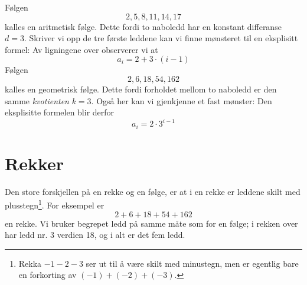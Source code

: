 Følgen 
\[ 2, 5, 8, 11, 14, 17 \]
kalles en aritmetisk følge. Dette fordi to naboledd har en konstant differanse $ {d=3} $. Skriver vi opp de tre første leddene kan vi finne mønsteret til en eksplisitt formel:
Av ligningene over observerer vi at
\[ a_i=2+3\cdot(i-1) \]
\ari\newpage
\arie
{} 
Følgen 
\[ 2, 6, 18, 54, 162 \]
kalles en geometrisk følge. Dette fordi forholdet mellom to naboledd er den samme \textit{kvotienten} $ {k=3} $. Også her kan vi gjenkjenne et fast mønster:
Den eksplisitte formelen blir derfor
\[ a_i = 2\cdot3^{i-1} \]
\geo
{}
\section{Rekker}
Den store forskjellen på en rekke og en følge, er at i en rekke er leddene skilt med plusstegn\footnote{Rekka ${ -1-2-3}$ ser ut til å være skilt med minustegn, men er egentlig bare en forkorting av $ {(-1)+(-2)+(-3)} $.}. 
For eksempel er
\[ 2+6+18+54+162 \]
en rekke. Vi bruker begrepet ledd på samme måte som for en følge; i rekken over har ledd nr. 3 verdien 18, og i alt er det fem ledd.\vsk

